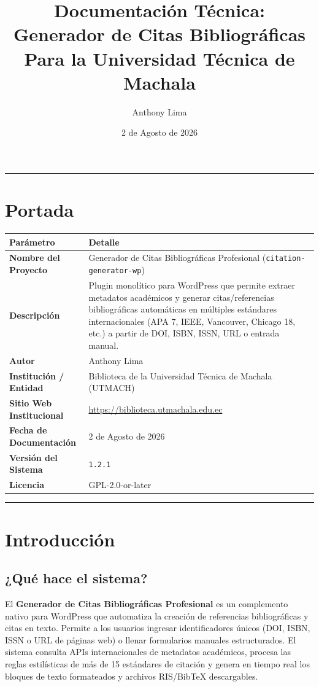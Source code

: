 \documentclass[11pt, a4paper]{article}
\title{Documentación Técnica:\\ Generador de Citas Bibliográficas Para la Universidad Técnica de Machala}
\author{Anthony Lima}
\date{2 de Agosto de 2026}
\begin{document}
\maketitle
\tableofcontents
\newpage



\bigskip\noindent\rule{\textwidth}{0.4pt}\bigskip




\section{Portada}

\begin{longtable}{|p{8.0cm}|p{8.0cm}|}
\hline
\textbf{Parámetro} & \textbf{Detalle} \\
\hline
\endhead
\textbf{Nombre del Proyecto} & Generador de Citas Bibliográficas Profesional (\texttt{citation-generator-wp}) \\
\hline
\textbf{Descripción} & Plugin monolítico para WordPress que permite extraer metadatos académicos y generar citas/referencias bibliográficas automáticas en múltiples estándares internacionales (APA 7, IEEE, Vancouver, Chicago 18, etc.) a partir de DOI, ISBN, ISSN, URL o entrada manual. \\
\hline
\textbf{Autor} & Anthony Lima \\
\hline
\textbf{Institución / Entidad} & Biblioteca de la Universidad Técnica de Machala (UTMACH) \\
\hline
\textbf{Sitio Web Institucional} & \href{https://biblioteca.utmachala.edu.ec}{https://biblioteca.utmachala.edu.ec} \\
\hline
\textbf{Fecha de Documentación} & 2 de Agosto de 2026 \\
\hline
\textbf{Versión del Sistema} & \texttt{1.2.1} \\
\hline
\textbf{Licencia} & GPL-2.0-or-later \\
\hline
\end{longtable}


\bigskip\noindent\rule{\textwidth}{0.4pt}\bigskip


\section{Introducción}

\subsection{¿Qué hace el sistema?}
El \textbf{Generador de Citas Bibliográficas Profesional} es un complemento nativo para WordPress que automatiza la creación de referencias bibliográficas y citas en texto. Permite a los usuarios ingresar identificadores únicos (DOI, ISBN, ISSN o URL de páginas web) o llenar formularios manuales estructurados. El sistema consulta APIs internacionales de metadatos académicos, procesa las reglas estilísticas de más de 15 estándares de citación y genera en tiempo real los bloques de texto formateados y archivos RIS/BibTeX descargables.
\end{document}
